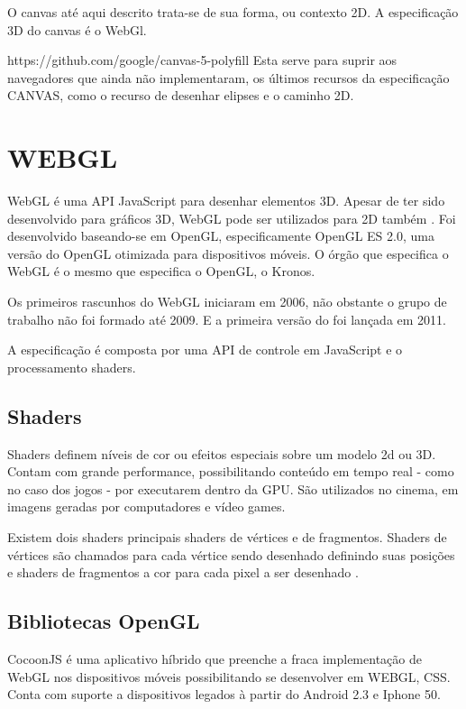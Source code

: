 O canvas até aqui descrito trata-se de sua forma, ou contexto 2D. A
especificação 3D do canvas é o WebGl.

https://github.com/google/canvas-5-polyfill Esta serve para
suprir aos navegadores que ainda não implementaram, os últimos recursos
da especificação CANVAS, como o recurso de desenhar elipses e o caminho 2D.
\section{WEBGL}
WebGL é uma API JavaScript para desenhar elementos 3D.
Apesar de ter sido desenvolvido para gráficos 3D, WebGL pode ser utilizados
para 2D também \autocite[pp. 6]{3daps}.
Foi desenvolvido baseando-se em OpenGL, especificamente OpenGL ES 2.0,
uma versão do OpenGL otimizada para dispositivos móveis. O órgão que
especifica o WebGL é o mesmo que especifica o OpenGL, o Kronos.

Os primeiros rascunhos do WebGL iniciaram em 2006, não obstante o grupo
de trabalho não foi formado até 2009. E a primeira versão do foi
lançada em 2011.

A especificação é composta por uma API de controle em JavaScript e o
processamento shaders.

\subsection{Shaders}

Shaders definem níveis de cor ou efeitos especiais sobre um modelo 2d ou 3D.
Contam com grande performance, possibilitando conteúdo em tempo real - como 
no caso dos jogos - por executarem dentro da GPU.
São utilizados no cinema, em imagens geradas por computadores e vídeo games.

Existem dois shaders principais shaders de vértices e de fragmentos.
Shaders de vértices são chamados para cada vértice sendo desenhado
definindo suas posições e shaders de fragmentos a cor para cada pixel
a ser desenhado \autocite[pp.15]{3daps}.

\subsection{Bibliotecas OpenGL}

CocoonJS é uma aplicativo híbrido que preenche a fraca implementação
de WebGL nos dispositivos móveis possibilitando se desenvolver em
WEBGL, CSS. Conta com suporte a dispositivos legados à partir do
Android 2.3 e Iphone 50.

